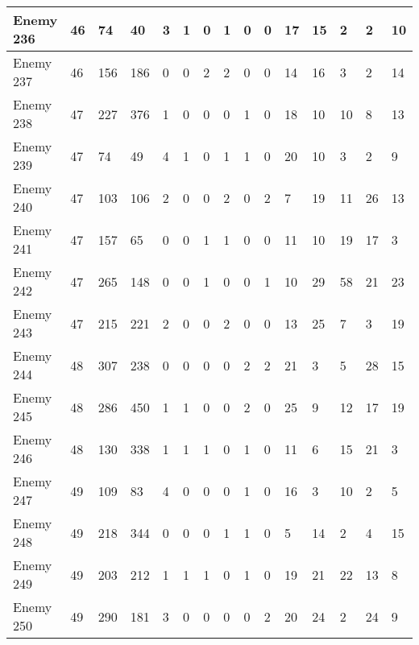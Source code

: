 \begin{sidewaystable}[!h]
{\begin{tabular}{|l|l|l|l|l|l|l|l|l|l|l|l|l|l|l|}
			Enemy 236 & 46 & 74 & 40 & 3 & 1 & 0 & 1 & 0 & 0 & 17 & 15 & 2 & 2 & 10 \\ \hline
			Enemy 237 & 46 & 156 & 186 & 0 & 0 & 2 & 2 & 0 & 0 & 14 & 16 & 3 & 2 & 14 \\ \hline
			Enemy 238 & 47 & 227 & 376 & 1 & 0 & 0 & 0 & 1 & 0 & 18 & 10 & 10 & 8 & 13 \\ \hline
			Enemy 239 & 47 & 74 & 49 & 4 & 1 & 0 & 1 & 1 & 0 & 20 & 10 & 3 & 2 & 9 \\ \hline
			Enemy 240 & 47 & 103 & 106 & 2 & 0 & 0 & 2 & 0 & 2 & 7 & 19 & 11 & 26 & 13 \\ \hline
			Enemy 241 & 47 & 157 & 65 & 0 & 0 & 1 & 1 & 0 & 0 & 11 & 10 & 19 & 17 & 3 \\ \hline
			Enemy 242 & 47 & 265 & 148 & 0 & 0 & 1 & 0 & 0 & 1 & 10 & 29 & 58 & 21 & 23 \\ \hline
			Enemy 243 & 47 & 215 & 221 & 2 & 0 & 0 & 2 & 0 & 0 & 13 & 25 & 7 & 3 & 19 \\ \hline
			Enemy 244 & 48 & 307 & 238 & 0 & 0 & 0 & 0 & 2 & 2 & 21 & 3 & 5 & 28 & 15 \\ \hline
			Enemy 245 & 48 & 286 & 450 & 1 & 1 & 0 & 0 & 2 & 0 & 25 & 9 & 12 & 17 & 19 \\ \hline
			Enemy 246 & 48 & 130 & 338 & 1 & 1 & 1 & 0 & 1 & 0 & 11 & 6 & 15 & 21 & 3 \\ \hline
			Enemy 247 & 49 & 109 & 83 & 4 & 0 & 0 & 0 & 1 & 0 & 16 & 3 & 10 & 2 & 5 \\ \hline
			Enemy 248 & 49 & 218 & 344 & 0 & 0 & 0 & 1 & 1 & 0 & 5 & 14 & 2 & 4 & 15 \\ \hline
			Enemy 249 & 49 & 203 & 212 & 1 & 1 & 1 & 0 & 1 & 0 & 19 & 21 & 22 & 13 & 8 \\ \hline
			Enemy 250 & 49 & 290 & 181 & 3 & 0 & 0 & 0 & 0 & 2 & 20 & 24 & 2 & 24 & 9 \\ \hline
		\end{tabular}%
	}
\end{sidewaystable}
\clearpage


